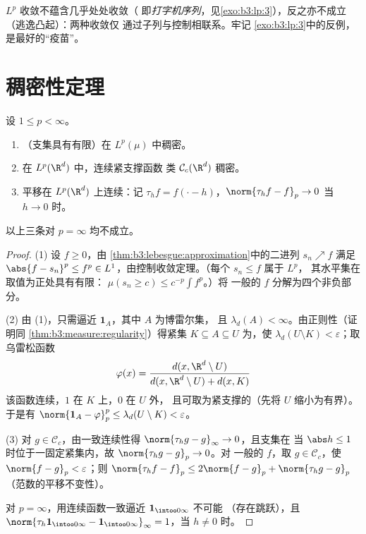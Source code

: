 \begin{remark}\label{rem:b3:lp:modes}
$L^p$ 收敛不蕴含几乎处处收敛（
即\emph{打字机序列}，见\cref{exo:b3:lp:3}），反之亦不成立
（逃逸凸起）：两种收敛仅
通过子列与控制相联系。牢记
\cref{exo:b3:lp:3}中的反例，是最好的“疫苗”。
\end{remark}

\section{稠密性定理}

\begin{theorem}\label{thm:b3:lp:density}
设 $1 \leq p < \infty$。
\begin{enumerate}
  \item {}（支集具有有限）在
        $L^p(\mu)$ 中稠密。
  \item 在 $L^p(\R^d)$ 中，连续紧支撑函数
        类 $\mathcal C_c(\R^d)$ 稠密。
  \item 平移在 $L^p(\R^d)$ 上连续：记
        $\tau_hf = f(\cdot - h)$，$\norm{\tau_hf - f}_p \to 0$
        当 $h \to 0$ 时。
\end{enumerate}
以上三条对 $p = \infty$ 均不成立。
\end{theorem}

\begin{proof}
(1) 设 $f \geq 0$，由
\cref{thm:b3:lebesgue:approximation}中的二进列 $s_n \nearrow f$ 满足 $\abs{f - s_n}^p
\leq f^p \in L^1$，由控制收敛定理。（每个 $s_n \leq f$ 属于 $L^p$，
其水平集在取值为正处具有有限：
$\mu(s_n \geq c) \leq c^{-p}\int f^p$。）将
一般的 $f$ 分解为四个非负部分。

(2) 由 (1)，只需逼近 $\mathbf 1_A$，其中 $A$ 为博雷尔集，
且 $\lambda_d(A) < \infty$。由正则性（证明同
\cref{thm:b3:measure:regularity}）得紧集 $K \subseteq A
\subseteq U$ 为，使 $\lambda_d(U\setminus K) <
\varepsilon$；取乌雷松函数
\[
\varphi(x) = \frac{d(x, \R^d\setminus U)}{d(x, \R^d\setminus U)
+ d(x, K)}
\]
该函数连续，$1$ 在 $K$ 上，$0$ 在 $U$ 外，
且可取为紧支撑的（先将 $U$ 缩小为有界）。于是有
$\norm{\mathbf 1_A - \varphi}_p^p \leq \lambda_d(U\setminus K)
< \varepsilon$。

(3) 对 $g \in \mathcal C_c$，由一致连续性得
$\norm{\tau_hg - g}_\infty \to 0$，且支集在
当 $\abs h \leq 1$ 时位于一固定紧集内，故 $\norm{\tau_hg - g}_p \to 0$。对
一般的 $f$，取 $g \in \mathcal C_c$，使 $\norm{f - g}_p <
\varepsilon$；则 $\norm{\tau_hf - f}_p \leq 2\norm{f - g}_p +
\norm{\tau_hg - g}_p$（范数的平移不变性）。

对 $p = \infty$，用连续函数一致逼近 $\mathbf
1_{\intoo0\infty}$ 不可能
（存在跳跃），且 $\norm{\tau_h\mathbf 1_{\intoo0\infty} - \mathbf
1_{\intoo0\infty}}_\infty = 1$，当 $h \neq 0$ 时。
\end{proof}

